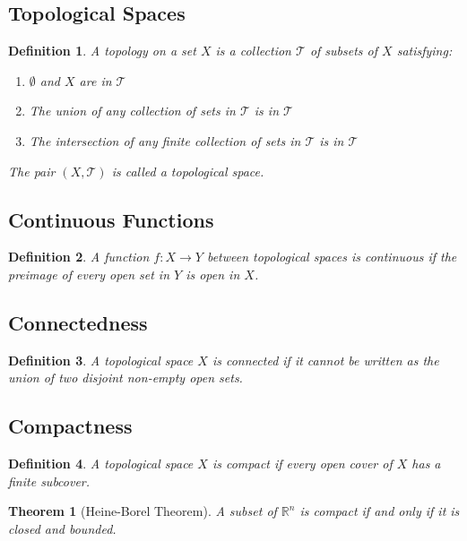 \documentclass[12pt,a4paper]{article}
\newtheorem{definition}{Definition}
\newtheorem{theorem}{Theorem}
\begin{document}
\subsection{Topological Spaces}

\begin{definition}
A topology on a set $X$ is a collection $\mathcal{T}$ of subsets of $X$ satisfying:
\begin{enumerate}
    \item $\emptyset$ and $X$ are in $\mathcal{T}$
    \item The union of any collection of sets in $\mathcal{T}$ is in $\mathcal{T}$
    \item The intersection of any finite collection of sets in $\mathcal{T}$ is in $\mathcal{T}$
\end{enumerate}
The pair $(X, \mathcal{T})$ is called a topological space.
\end{definition}

\subsection{Continuous Functions}

\begin{definition}
A function $f: X \to Y$ between topological spaces is continuous if the preimage of every open set in $Y$ is open in $X$.
\end{definition}

\subsection{Connectedness}

\begin{definition}
A topological space $X$ is connected if it cannot be written as the union of two disjoint non-empty open sets.
\end{definition}

\subsection{Compactness}

\begin{definition}
A topological space $X$ is compact if every open cover of $X$ has a finite subcover.
\end{definition}

\begin{theorem}[Heine-Borel Theorem]
A subset of $\mathbb{R}^n$ is compact if and only if it is closed and bounded.
\end{theorem}
\end{document}
